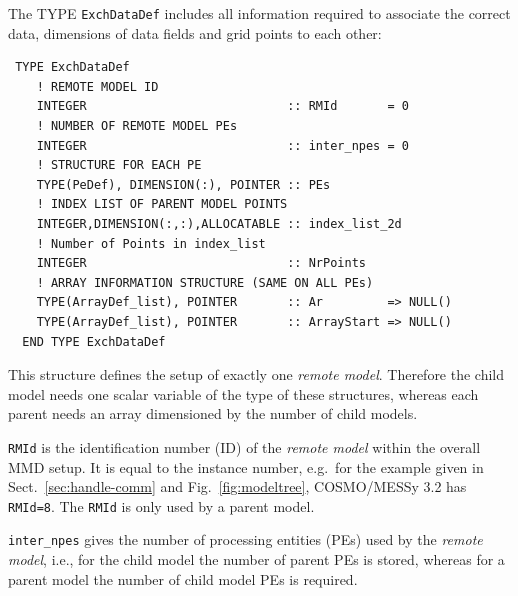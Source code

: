 \documentclass[twoside]{article}
\begin{document}
The {\footnotesize TYPE} \verb|ExchDataDef| includes all information
required to associate the correct data, dimensions of data fields and
grid points to each other:
\begin{verbatim}
 TYPE ExchDataDef
    ! REMOTE MODEL ID
    INTEGER                            :: RMId       = 0
    ! NUMBER OF REMOTE MODEL PEs
    INTEGER                            :: inter_npes = 0   
    ! STRUCTURE FOR EACH PE
    TYPE(PeDef), DIMENSION(:), POINTER :: PEs
    ! INDEX LIST OF PARENT MODEL POINTS
    INTEGER,DIMENSION(:,:),ALLOCATABLE :: index_list_2d
    ! Number of Points in index_list
    INTEGER                            :: NrPoints 
    ! ARRAY INFORMATION STRUCTURE (SAME ON ALL PEs)
    TYPE(ArrayDef_list), POINTER       :: Ar         => NULL()
    TYPE(ArrayDef_list), POINTER       :: ArrayStart => NULL()
  END TYPE ExchDataDef
\end{verbatim}
This structure defines the setup of exactly one {\it remote
model}. Therefore the child model needs one scalar variable of the type
of these structures, whereas each parent needs an array dimensioned by
the number of child models. 

\verb|RMId| is the identification number (ID) of the {\it remote 
model} within the overall MMD setup. It is equal to the instance
 number, e.g.\ for the example given in Sect.\ \ref{sec:handle-comm}
 and Fig.\ \ref{fig:modeltree}, COSMO/MESSy 3.2 has 
 \verb|RMId=8|. The \verb|RMId| is only used by a parent model.

\verb|inter_npes| gives the number of processing entities (PEs) used by the 
{\it remote model}, i.e., for the child model the number of parent PEs is
stored, whereas for a parent model the number of child model PEs is required.
\end{document}
